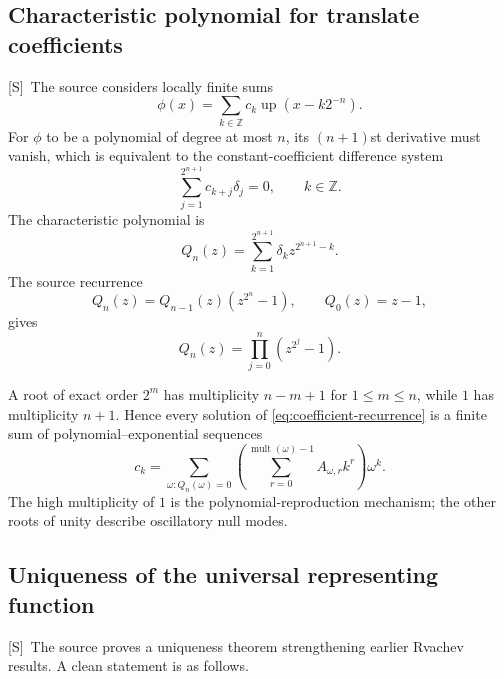 \documentclass[11pt,oneside]{article}
\theoremstyle{definition}
\theoremstyle{remark}
\newcommand{\Z}{\mathbb Z}
\newcommand{\Up}{\operatorname{up}}
\newcommand{\Smark}{\textcolor{sourceblue}{\textsf{[S]}}}
\begin{document}
\subsection{Characteristic polynomial for translate coefficients}

\Smark\ The source considers locally finite sums
\begin{equation}
 \phi(x)=\sum_{k\in\Z}c_k\Up(x-k2^{-n}).
 \tag{S3.76}
 \label{eq:translate-sum}
\end{equation}
For $\phi$ to be a polynomial of degree at most $n$, its $(n+1)$st derivative must vanish,
which is equivalent to the constant-coefficient difference system
\begin{equation}
 \sum_{j=1}^{2^{n+1}}c_{k+j}\delta_j=0,
 \qquad k\in\Z.
 \tag{S3.77}
 \label{eq:coefficient-recurrence}
\end{equation}
The characteristic polynomial is
\begin{equation}
 Q_n(z)=\sum_{k=1}^{2^{n+1}}\delta_kz^{2^{n+1}-k}.
 \tag{S3.79}
 \label{eq:Qn-def}
\end{equation}
The source recurrence
\begin{equation}
 Q_n(z)=Q_{n-1}(z)(z^{2^n}-1),\qquad Q_0(z)=z-1,
 \tag{S3.80--S3.81}
 \label{eq:Qn-recurrence}
\end{equation}
gives
\begin{equation}
 \boxed{\quad Q_n(z)=\prod_{j=0}^{n}(z^{2^j}-1).\quad}
 \label{eq:Qn-product}
\end{equation}

A root of exact order $2^m$ has multiplicity $n-m+1$ for $1\le m\le n$, while $1$ has
multiplicity $n+1$.  Hence every solution of \eqref{eq:coefficient-recurrence} is a finite sum
of polynomial--exponential sequences
\begin{equation}
 c_k=\sum_{\omega:Q_n(\omega)=0}
 \left(\sum_{r=0}^{\operatorname{mult}(\omega)-1}A_{\omega,r}k^r\right)\omega^k.
 \label{eq:recurrence-general-solution}
\end{equation}
The high multiplicity of $1$ is the polynomial-reproduction mechanism; the other roots of
unity describe oscillatory null modes.

\subsection{Uniqueness of the universal representing function}

\Smark\ The source proves a uniqueness theorem strengthening earlier Rvachev results.
A clean statement is as follows.
\end{document}
